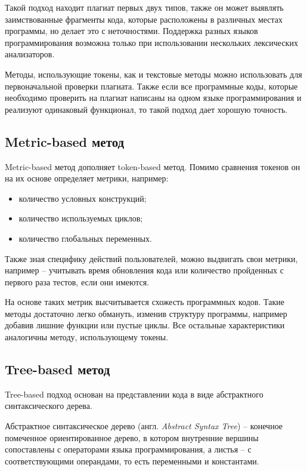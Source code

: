Такой подход находит плагиат первых двух типов, также он может выявлять заимствованные фрагменты кода, которые расположены в различных местах программы, но делает это с неточностями. Поддержка разных языков программирования возможна только при использовании нескольких лексических анализаторов.

Методы, использующие токены, как и текстовые методы можно использовать для первоначальной проверки плагиата. Также если все программные коды, которые необходимо проверить на плагиат написаны на одном языке программирования и реализуют одинаковый функционал, то такой подход дает хорошую точность.

\subsection{Metric-based метод}

Metric-based метод дополняет token-based метод. Помимо сравнения токенов он на их основе определяет метрики, например:
\begin{itemize}[label*=---]
	\item количество условных конструкций;
	\item количество используемых циклов;
	\item количество глобальных переменных. 
\end{itemize}

Также зная специфику действий пользователей, можно выдвигать свои метрики, например -- учитывать время обновления кода или  количество пройденных с первого раза тестов, если они имеются.

На основе таких метрик высчитывается схожесть программных кодов. Такие методы достаточно легко обмануть, изменив структуру программы, например добавив лишние функции или пустые циклы. Все остальные характеристики аналогичны методу, использующему токены. 

\subsection{Tree-based метод}

Tree-based подход основан на представлении кода в виде абстрактного синтаксического дерева. 

Абстрактное синтаксическое дерево (англ. \textit{Abstract Syntax Tree}) --  конечное помеченное ориентированное дерево, в котором внутренние вершины сопоставлены с операторами языка программирования, а листья -- с соответствующими операндами, то есть переменными и константами.

